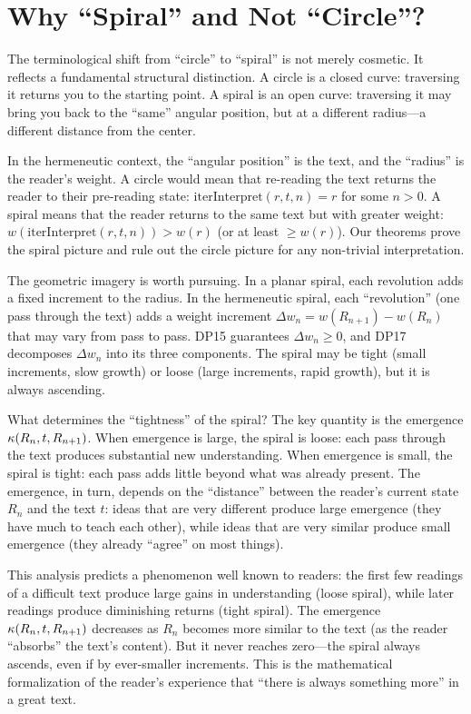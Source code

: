 \section{Why ``Spiral'' and Not ``Circle''?}

The terminological shift from ``circle'' to ``spiral'' is not merely
cosmetic. It reflects a fundamental structural distinction. A circle
is a closed curve: traversing it returns you to the starting point.
A spiral is an open curve: traversing it may bring you back to the
``same'' angular position, but at a different radius---a different
distance from the center.

In the hermeneutic context, the ``angular position'' is the text, and
the ``radius'' is the reader's weight. A circle would mean that
re-reading the text returns the reader to their pre-reading state:
$\mathrm{iterInterpret}(r, t, n) = r$ for some $n > 0$. A spiral means
that the reader returns to the same text but with greater weight:
$w(\mathrm{iterInterpret}(r, t, n)) > w(r)$ (or at least
$\geq w(r)$). Our theorems prove the spiral picture and rule out the
circle picture for any non-trivial interpretation.

The geometric imagery is worth pursuing. In a planar spiral, each
revolution adds a fixed increment to the radius. In the hermeneutic
spiral, each ``revolution'' (one pass through the text) adds a weight
increment $\Delta w_n = w(R_{n+1}) - w(R_n)$ that may vary from pass
to pass. DP15 guarantees $\Delta w_n \geq 0$, and DP17 decomposes
$\Delta w_n$ into its three components. The spiral may be tight
(small increments, slow growth) or loose (large increments, rapid
growth), but it is always ascending.

What determines the ``tightness'' of the spiral? The key quantity is
the emergence $\kappa(R_n, t, R_{n+1})$. When emergence is large,
the spiral is loose: each pass through the text produces substantial
new understanding. When emergence is small, the spiral is tight: each
pass adds little beyond what was already present. The emergence, in
turn, depends on the ``distance'' between the reader's current state
$R_n$ and the text $t$: ideas that are very different produce large
emergence (they have much to teach each other), while ideas that are
very similar produce small emergence (they already ``agree'' on most
things).

This analysis predicts a phenomenon well known to readers: the first
few readings of a difficult text produce large gains in understanding
(loose spiral), while later readings produce diminishing returns
(tight spiral). The emergence $\kappa(R_n, t, R_{n+1})$ decreases
as $R_n$ becomes more similar to the text (as the reader ``absorbs''
the text's content). But it never reaches zero---the spiral always
ascends, even if by ever-smaller increments. This is the mathematical
formalization of the reader's experience that ``there is always
something more'' in a great text.


